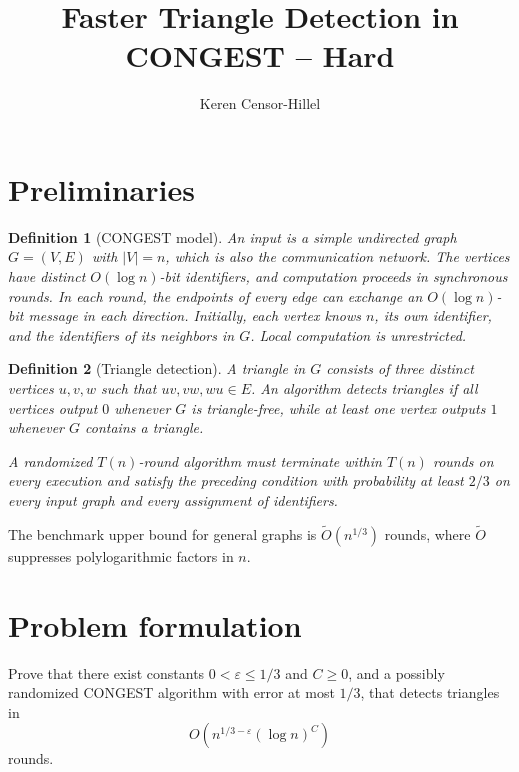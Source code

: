 \documentclass[10pt]{article}
\title{Faster Triangle Detection in CONGEST -- Hard}
\author{Keren Censor-Hillel}
\date{}
\newtheorem{definition}{Definition}
\begin{document}
\maketitle

\section{Preliminaries}

\begin{definition}[CONGEST model]
An input is a simple undirected graph $G=(V,E)$ with $|V|=n$, which is also
the communication network. The vertices have distinct $O(\!\log n)$-bit
identifiers, and computation proceeds in synchronous rounds. In each round,
the endpoints of every edge can exchange an $O(\!\log n)$-bit message in
each direction. Initially, each vertex knows $n$, its own identifier, and
the identifiers of its neighbors in $G$. Local computation is unrestricted.
\end{definition}

\begin{definition}[Triangle detection]
A triangle in $G$ consists of three distinct vertices $u,v,w$ such that
$uv,vw,wu\in E$. An algorithm detects triangles if all vertices output $0$
whenever $G$ is triangle-free, while at least one vertex outputs $1$
whenever $G$ contains a triangle.

A randomized $T(n)$-round algorithm must terminate within $T(n)$ rounds on
every execution and satisfy the preceding condition with probability at
least $2/3$ on every input graph and every assignment of identifiers.
\end{definition}

The benchmark upper bound for general graphs is
$\widetilde O(n^{1/3})$ rounds, where $\widetilde O$ suppresses
polylogarithmic factors in $n$.

\section{Problem formulation}

Prove that there exist constants $0<\varepsilon\leq 1/3$ and $C\geq 0$,
and a possibly randomized CONGEST algorithm with error at most $1/3$, that
detects triangles in
\[
O\!\left(n^{1/3-\varepsilon}(\log n)^C\right)
\]
rounds.
\end{document}
